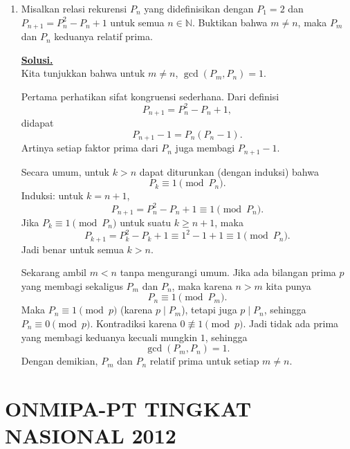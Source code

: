 \documentclass[12pt,twoside]{article}
\newenvironment{solution}
{
	\par\noindent\textbf{\underline{Solusi.}}\\
}
{
	\par
}
\begin{document}
\begin{enumerate}
  \item Misalkan relasi rekurensi $P_n$ yang didefinisikan dengan $P_1=2$ dan $P_{n+1}=P_n^2-P_n+1$ untuk semua $n\in\mathbb{N}$. Buktikan bahwa $m\neq n$, maka $P_m$ dan $P_n$ keduanya relatif prima.
        \begin{solution}
          Kita tunjukkan bahwa untuk $m\ne n$, $\gcd(P_m,P_n)=1$.

          Pertama perhatikan sifat kongruensi sederhana. Dari definisi
          \[
            P_{n+1}=P_n^2-P_n+1,
          \]
          didapat
          \[
            P_{n+1}-1=P_n(P_n-1).
          \]
          Artinya setiap faktor prima dari $P_n$ juga membagi $P_{n+1}-1$.

          Secara umum, untuk $k>n$ dapat diturunkan (dengan induksi) bahwa
          \[
            P_k\equiv1\pmod{P_n}.
          \]
          Induksi: untuk $k=n+1$,
          \[
            P_{n+1}=P_n^2-P_n+1\equiv1\pmod{P_n}.
          \]
          Jika $P_{k}\equiv1\pmod{P_n}$ untuk suatu $k\ge n+1$, maka
          \[
            P_{k+1}=P_k^2-P_k+1\equiv1^2-1+1\equiv1\pmod{P_n}.
          \]
          Jadi benar untuk semua $k>n$.

          Sekarang ambil $m<n$ tanpa mengurangi umum. Jika ada bilangan prima $p$ yang membagi sekaligus $P_m$ dan $P_n$, maka karena $n>m$ kita punya
          \[
            P_n\equiv1\pmod{P_m}.
          \]
          Maka $P_n\equiv1\pmod p$ (karena $p\mid P_m$), tetapi juga $p\mid P_n$, sehingga $P_n\equiv0\pmod p$. Kontradiksi karena $0\not\equiv1\pmod p$. Jadi tidak ada prima yang membagi keduanya kecuali mungkin $1$, sehingga
          \[
            \gcd(P_m,P_n)=1.
          \]
          Dengan demikian, $P_m$ dan $P_n$ relatif prima untuk setiap $m\ne n$.
        \end{solution}
\end{enumerate}
\newpage
{}
\section{ONMIPA-PT TINGKAT NASIONAL 2012}
\end{document}
